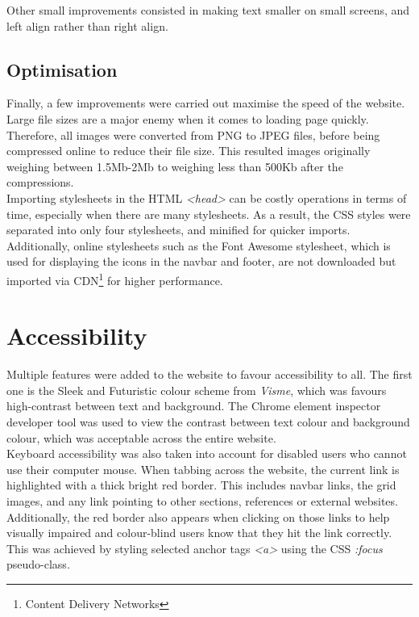 \documentclass[letterpaper,12pt]{article}
\begin{document}
Other small improvements consisted in making text smaller on small screens, and left align rather than right align.

\subsection{Optimisation}

Finally, a few improvements were carried out maximise the speed of the website. Large file sizes are a major enemy when it comes to loading page quickly. Therefore, all images were converted from PNG to JPEG files, before being compressed online to reduce their file size. This resulted images originally weighing between 1.5Mb-2Mb to weighing less than 500Kb after the compressions.\\

Importing stylesheets in the HTML \textit{\textless head\textgreater} can be costly operations in terms of time, especially when there are many stylesheets. As a result, the CSS styles were separated into only four stylesheets, and minified for quicker imports. Additionally, online stylesheets such as the Font Awesome stylesheet, which is used for displaying the icons in the navbar and footer, are not downloaded but imported via CDN\footnote{Content Delivery Networks} for higher performance.

\section{Accessibility}
\label{sec:accessibility}

Multiple features were added to the website to favour accessibility to all. The first one is the Sleek and Futuristic colour scheme from \textit{Visme}, which was favours high-contrast between text and background. The Chrome element inspector developer tool was used to view the contrast between text colour and background colour, which was acceptable across the entire website.\\

Keyboard accessibility was also taken into account for disabled users who cannot use their computer mouse. When tabbing across the website, the current link is highlighted with a thick bright red border. This includes navbar links, the grid images, and any link pointing to other sections, references or external websites. Additionally, the red border also appears when clicking on those links to help visually impaired and colour-blind users know that they hit the link correctly. This was achieved by styling selected anchor tags \textit{\textless a\textgreater} using the CSS \textit{:focus} pseudo-class.\\
\end{document}
